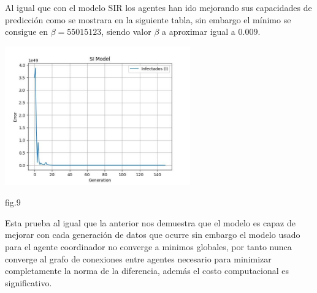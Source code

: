 Al igual que con el modelo SIR los agentes han ido mejorando sus capacidades de predicción como se mostrara en la siguiente tabla, sin embargo el mínimo se consigue en 
$\beta=55015123$, siendo valor $\beta$ a aproximar igual a $0.009$. 

\begin{center}
     
 \includegraphics[width=0.6\textwidth]{images/plt1492.jpg} 
 \begin{center}
    
    fig.9
 \end{center}
\end{center}


Esta prueba al igual que la anterior nos demuestra que el modelo es capaz de mejorar con cada generación de datos que ocurre sin embargo el modelo usado 
para el agente coordinador no converge a minimos globales, por tanto nunca converge al grafo de conexiones entre agentes necesario para minimizar completamente la 
norma de la diferencia, además el costo computacional es significativo.